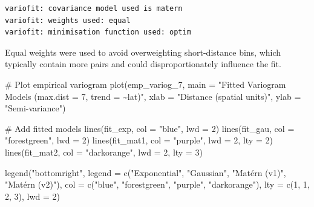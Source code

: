 \documentclass[
  11pt,
]{article}
\newenvironment{Shaded}{\begin{snugshade}}{\end{snugshade}}
\newcommand{\AttributeTok}[1]{\textcolor[rgb]{0.40,0.45,0.13}{#1}}
\newcommand{\CommentTok}[1]{\textcolor[rgb]{0.37,0.37,0.37}{#1}}
\newcommand{\DecValTok}[1]{\textcolor[rgb]{0.68,0.00,0.00}{#1}}
\newcommand{\FunctionTok}[1]{\textcolor[rgb]{0.28,0.35,0.67}{#1}}
\newcommand{\NormalTok}[1]{\textcolor[rgb]{0.00,0.23,0.31}{#1}}
\newcommand{\StringTok}[1]{\textcolor[rgb]{0.13,0.47,0.30}{#1}}
\begin{document}
\begin{verbatim}
variofit: covariance model used is matern 
variofit: weights used: equal 
variofit: minimisation function used: optim 
\end{verbatim}

Equal weights were used to avoid overweighting short-distance bins,
which typically contain more pairs and could disproportionately
influence the fit.

\begin{Shaded}
\begin{Highlighting}[]
\CommentTok{\# Plot empirical variogram}
\FunctionTok{plot}\NormalTok{(emp\_variog\_7,}
     \AttributeTok{main =} \StringTok{"Fitted Variogram Models (max.dist = 7, trend = \textasciitilde{}lat)"}\NormalTok{,}
     \AttributeTok{xlab =} \StringTok{"Distance (spatial units)"}\NormalTok{, }\AttributeTok{ylab =} \StringTok{"Semi{-}variance"}\NormalTok{)}

\CommentTok{\# Add fitted models}
\FunctionTok{lines}\NormalTok{(fit\_exp, }\AttributeTok{col =} \StringTok{"blue"}\NormalTok{, }\AttributeTok{lwd =} \DecValTok{2}\NormalTok{)}
\FunctionTok{lines}\NormalTok{(fit\_gau, }\AttributeTok{col =} \StringTok{"forestgreen"}\NormalTok{, }\AttributeTok{lwd =} \DecValTok{2}\NormalTok{)}
\FunctionTok{lines}\NormalTok{(fit\_mat1, }\AttributeTok{col =} \StringTok{"purple"}\NormalTok{, }\AttributeTok{lwd =} \DecValTok{2}\NormalTok{, }\AttributeTok{lty =} \DecValTok{2}\NormalTok{)}
\FunctionTok{lines}\NormalTok{(fit\_mat2, }\AttributeTok{col =} \StringTok{"darkorange"}\NormalTok{, }\AttributeTok{lwd =} \DecValTok{2}\NormalTok{, }\AttributeTok{lty =} \DecValTok{3}\NormalTok{)}

\FunctionTok{legend}\NormalTok{(}\StringTok{"bottomright"}\NormalTok{,}
       \AttributeTok{legend =} \FunctionTok{c}\NormalTok{(}\StringTok{"Exponential"}\NormalTok{, }\StringTok{"Gaussian"}\NormalTok{, }\StringTok{"Matérn (v1)"}\NormalTok{, }\StringTok{"Matérn (v2)"}\NormalTok{),}
       \AttributeTok{col =} \FunctionTok{c}\NormalTok{(}\StringTok{"blue"}\NormalTok{, }\StringTok{"forestgreen"}\NormalTok{, }\StringTok{"purple"}\NormalTok{, }\StringTok{"darkorange"}\NormalTok{),}
       \AttributeTok{lty =} \FunctionTok{c}\NormalTok{(}\DecValTok{1}\NormalTok{, }\DecValTok{1}\NormalTok{, }\DecValTok{2}\NormalTok{, }\DecValTok{3}\NormalTok{),}
       \AttributeTok{lwd =} \DecValTok{2}\NormalTok{)}
\end{Highlighting}
\end{Shaded}
\end{document}
